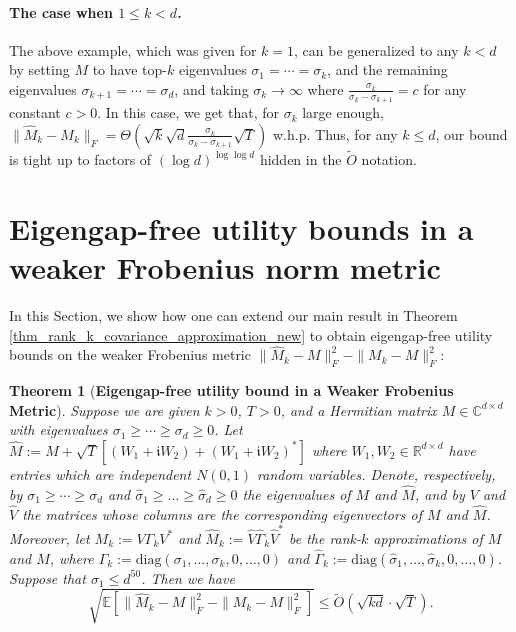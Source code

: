 \documentclass[11pt,letterpaper]{article}
\newtheorem{theorem}{Theorem}[section]
\begin{document}
{\paragraph{The case when $1\leq k<d$.} The above example, which was given for $k=1$, can be generalized to any $k<d$ by setting $M$ to have top-$k$ eigenvalues $\sigma_1 = \cdots = \sigma_k$, and the remaining eigenvalues $\sigma_{k+1}= \cdots = \sigma_d$, and taking $\sigma_k \rightarrow \infty$ where $\frac{\sigma_k}{\sigma_{k}- \sigma_{k+1}} = c$ for any constant $c>0$.
%
In this case, we get that, for $\sigma_k$ large enough, $\|\hat{M}_k - M_k\|_F = \Theta(\sqrt{k} \sqrt{d} \frac{\sigma_k}{\sigma_k- \sigma_{k+1}} \sqrt{T})$ w.h.p.
 Thus, for any $k\leq d$, our bound is tight up to factors of $(\log d)^{\log \log d}$ hidden in the $\tilde{O}$ notation.}


\section{Eigengap-free utility bounds in a weaker Frobenius norm metric} \label{appendix_gap_free_bounds_in_weaker_metric}

In this Section, we show how one can extend our main result in Theorem \ref{thm_rank_k_covariance_approximation_new} to obtain eigengap-free utility bounds on the weaker Frobenius metric $\|\hat{M}_k - M\|_F^2 - \|M_k - M\|_F^2$:


\begin{theorem}[\bf Eigengap-free utility bound in a Weaker Frobenius Metric]\label{thm_weaker_Frobenius_metric}
Suppose we are given $k>0$, $T>0$, and a  Hermitian matrix  $M \in \mathbb{C}^{d \times d}$ with eigenvalues  $\sigma_1 \geq \cdots \geq \sigma_d \geq 0$.   
%
Let $\hat{M} := M + \sqrt{T}[(W_1 + \mathfrak{i}W_2) + (W_1 + \mathfrak{i}W_2)^\ast]$ where $W_1, W_2 \in \mathbb{R}^{d \times d}$ have entries which are independent $N(0,1)$ random variables.
%
 Denote, respectively, by  $\sigma_1 \geq \cdots \geq \sigma_d$ and  $\hat{\sigma}_1\geq \ldots \geq \hat{\sigma}_d \geq 0$ the eigenvalues of $M$ and $\hat{M}$, and by $V$ and  $\hat{V}$ the matrices whose columns are the corresponding eigenvectors of $M$ and $\hat{M}$.
%
Moreover, let  $M_k := V \Gamma_k V^\ast$ and  $\hat{M}_k := \hat{V} \hat{\Gamma}_k \hat{V}^\ast$ be the rank-$k$ approximations of $M$ and $\hat{M}$, where $\Gamma_k := \mathrm{diag}(\sigma_1,\ldots, \sigma_k,0,\ldots,0)$  and $\hat{\Gamma}_k := \mathrm{diag}(\hat{\sigma}_1,\ldots, \hat{\sigma}_k,0,\ldots,0)$.
%
%
Suppose that $\sigma_1 \leq d^{50}$.
%
Then we have
$$ 
 \sqrt{\mathbb{E}[\|\hat{M}_k - M\|_F^2 - \|M_k - M\|_F^2]} \leq \tilde{O}\left(\sqrt{kd} \cdot \sqrt{T}\right).
$$
\end{theorem}
\end{document}
